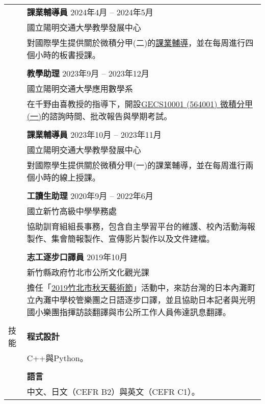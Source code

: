 \documentclass[letterpaper, 11pt]{article}
\begin{document}
\begin{CJK*}{UTF8}{bsmi}
\begin{center}
\begin{longtable}{p{0.72in}p{5.97in}}
        & \textbf{課業輔導員} \hfill 2024年4月 -- 2024年5月 \\
        & 國立陽明交通大學教學發展中心\\
        & 對國際學生提供關於微積分甲(二)的\href{https://github.com/eiken59/2024_II_Tutor}{課業輔導}，並在每周進行四個小時的板書授課。\\
        & \\

        & \textbf{教學助理} \hfill 2023年9月 -- 2023年12月 \\
        & 國立陽明交通大學應用數學系\\
        & 在千野由喜教授的指導下，開設\href{https://timetable.nycu.edu.tw/?r=main/crsoutline&Acy=112&Sem=1&CrsNo=564001&lang=zh-tw}{GECS10001 (564001) 微積分甲(一)}的諮詢時間、批改報告與學期考試。\\
        & \\

        & \textbf{課業輔導員} \hfill 2023年10月 -- 2023年11月 \\
        & 國立陽明交通大學教學發展中心\\
        & 對國際學生提供關於微積分甲(一)的課業輔導，並在每周進行兩個小時的線上授課。\\
        & \\
        
        & \textbf{工讀生助理} \hfill 2020年9月 -- 2022年6月 \\
        & 國立新竹高級中學學務處\\
        & 協助訓育組組長事務，包含自主學習平台的維護、校內活動海報製作、集會簡報製作、宣傳影片製作以及文件建檔。\\
        & \\

        & \textbf{志工逐步口譯員} \hfill 2019年10月\\
        & 新竹縣政府竹北市公所文化觀光課\\
        & 擔任「\href{https://www.chupei.gov.tw/travel/p2_1_2.php?bigact_id=111}{2019竹北市秋天藝術節}」活動中，來訪台灣的日本內灘町立內灘中學校管樂團之日語逐步口譯，並且協助日本記者與光明國小樂團指揮訪談翻譯與市公所工作人員佈達訊息翻譯。\\
        & \\
        
        
        {\textcolor{OliveGreen}{技能}} 
        & \textbf{程式設計}\\
        & C++與Python。 \\
        & \\
        
        & \textbf{語言} \\
        & 中文、日文（CEFR B2）與英文（CEFR C1）。 \\
        
        
    \end{longtable}
\end{center}

\end{CJK*}
\end{document}
